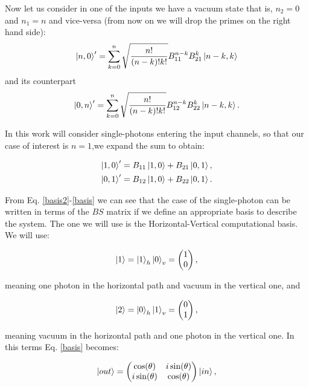\documentclass{book}
\begin{document}
Now let us consider in one of the inputs we have a vacuum state that is, $n_{2}=0$ and $n_{1}=n$  and vice-versa (from now on we will drop the primes on the right hand side):
\begin{equation}
 \ket{n,0}'=\sum^{n}_{k=0} \sqrt{\frac{n!}{(n-k)!k!}} B_{11}^{n-k} B_{21}^{k} \ket{n-k,k}
\end{equation}
and its counterpart
\begin{equation}
     \ket{0,n}'=\sum^{n}_{k=0} \sqrt{\frac{n!}{(n-k)!k!}} B_{12}^{n-k} B_{22}^{k} \ket{n-k,k}.
\end{equation}

In this work will consider single-photons entering the input channels, so that our case of interest is $n=1$,we expand the sum to obtain:

\begin{align}
\ket{1,0}'=B_{11}\ket{1,0}+B_{21}\ket{0,1},\label{basis2} \\
\ket{0,1}'=B_{12}\ket{1,0}+B_{22}\ket{0,1}.
\label{basis}
\end{align}


From Eq. \ref{basis2}-\ref{basis} we can see that the case of the single-photon can be written in terms of the $BS$ matrix if we define an appropriate basis to describe the system. The one we will use is the Horizontal-Vertical computational basis. We will use:

 \begin{equation}
 \ket{1}=\ket{1}_{h}\ket{0}_{v}=\begin{pmatrix} 1 \\0\end{pmatrix},
 \end{equation}

 meaning one photon in the horizontal path and vacuum in the vertical one, and
 
 \begin{equation}
 \ket{2}=\ket{0}_{h}\ket{1}_{v}=\begin{pmatrix} 0 \\1 \end{pmatrix},
 \end{equation}
 
meaning vacuum  in the horizontal path and one photon in the vertical one. In this terms Eq. \ref{basis} becomes:

\begin{equation}
\ket{out}=\begin{pmatrix} \cos(\theta) & i \sin(\theta) \\ i \sin(\theta) & \cos(\theta) \end{pmatrix} \ket{in},
\end{equation}
\end{document}
